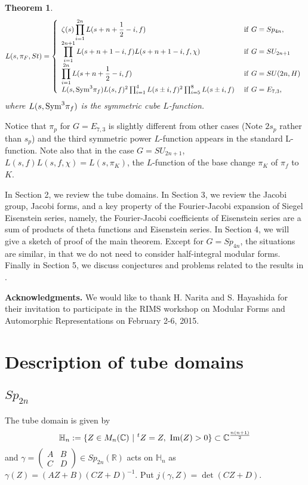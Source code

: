 \documentclass[11pt]{amsart}
\numberwithin{equation}{section}
\newtheorem{theorem}{Theorem}[section]
\theoremstyle{definition}
\begin{document}
\begin{theorem}\label{main-thm2}
$$L(s,\pi_F,St)= \left\{
\begin{array}{ll}
\zeta(s)\displaystyle \prod_{i=1}^{2n} L(s+n+\frac 12-i,f)  &\ {\rm if}\ G=Sp_{4n},\\
\displaystyle \prod_{i=1}^{2n+1} L(s+n+1-i,f)L(s+n+1-i,f,\chi) &\ {\rm if}\ G=SU_{2n+1} \\
 \displaystyle \prod_{i=1}^{2n} L(s+n+\frac 12-i,f) &\ {\rm if}\ G=SU(2n,H) \\
L(s,{\rm Sym}^3 \pi_f)L(s,f)^2 {\displaystyle}\prod_{i=1}^4 L(s\pm i,f)^2 \prod_{i=5}^8 L(s\pm i, f) &\ {\rm if}\ G=E_{7,3},
\end{array}\right.
$$
where $L(s,{\rm Sym}^3 \pi_f)$ is the symmetric cube $L$-function.
\end{theorem}
Notice that $\pi_p$ for $G=E_{7,3}$ is slightly different from other cases (Note $2s_p$ rather than $s_p$) and
the third symmetric power $L$-function appears in the standard L-function. Note also that in the case $G=SU_{2n+1}$, $L(s,f)L(s,f,\chi)=L(s, \pi_K)$, the $L$-function of the base change $\pi_K$ of $\pi_f$ to $K$.

In Section 2, we review the tube domains.
In Section 3, we review the Jacobi group,
Jacobi forms, and a key property of the Fourier-Jacobi expansion of
Siegel Eisenstein series, namely, the Fourier-Jacobi coefficients of Eisenstein series are a sum of products of theta functions and Eisenstein series.
In Section 4, we will give a sketch of proof of the main theorem.
Except for $G=Sp_{4n}$, the situations are similar, in that we do not need to consider half-integral modular forms.
Finally  in Section 5, we discuss conjectures and problems related to the results in \cite{KY}.

\smallskip

\textbf{Acknowledgments.} We would like to thank H. Narita and S. Hayashida for their invitation to participate in the RIMS workshop on Modular Forms and Automorphic Representations on February 2-6, 2015.

\section{Description of tube domains}
\subsection{$Sp_{2n}$}
The tube domain is given by
$$\mathbb{H}_n:=\{Z\in M_{n}({\mathbb{C}})\ |\ {}^tZ=Z,\ {\rm Im}(Z)>0 \}\subset {\mathbb{C}}^{\frac{n(n+1)}{2}}$$
and $\gamma=\left(
\begin{array}{cc}
A & B \\
C & D
\end{array}\right)\in Sp_{2n}({\mathbb{R}})$ acts on $\mathbb{H}_n$ as
$\gamma(Z)=(AZ+B)(CZ+D)^{-1}$. Put $j(\gamma,Z)=\det(CZ+D)$.
\end{document}
